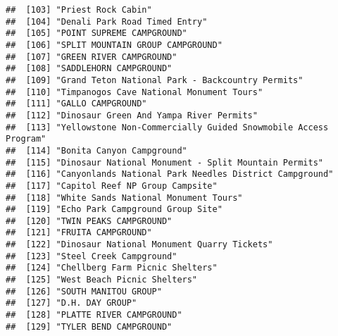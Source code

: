 \documentclass[
]{article}
\begin{document}
\begin{verbatim}
##  [103] "Priest Rock Cabin"                                                                   
##  [104] "Denali Park Road Timed Entry"                                                        
##  [105] "POINT SUPREME CAMPGROUND"                                                            
##  [106] "SPLIT MOUNTAIN GROUP CAMPGROUND"                                                     
##  [107] "GREEN RIVER CAMPGROUND"                                                              
##  [108] "SADDLEHORN CAMPGROUND"                                                               
##  [109] "Grand Teton National Park - Backcountry Permits"                                     
##  [110] "Timpanogos Cave National Monument Tours"                                             
##  [111] "GALLO CAMPGROUND"                                                                    
##  [112] "Dinosaur Green And Yampa River Permits"                                              
##  [113] "Yellowstone Non-Commercially Guided Snowmobile Access Program"                       
##  [114] "Bonita Canyon Campground"                                                            
##  [115] "Dinosaur National Monument - Split Mountain Permits"                                 
##  [116] "Canyonlands National Park Needles District Campground"                               
##  [117] "Capitol Reef NP Group Campsite"                                                      
##  [118] "White Sands National Monument Tours"                                                 
##  [119] "Echo Park Campground Group Site"                                                     
##  [120] "TWIN PEAKS CAMPGROUND"                                                               
##  [121] "FRUITA CAMPGROUND"                                                                   
##  [122] "Dinosaur National Monument Quarry Tickets"                                           
##  [123] "Steel Creek Campground"                                                              
##  [124] "Chellberg Farm Picnic Shelters"                                                      
##  [125] "West Beach Picnic Shelters"                                                          
##  [126] "SOUTH MANITOU GROUP"                                                                 
##  [127] "D.H. DAY GROUP"                                                                      
##  [128] "PLATTE RIVER CAMPGROUND"                                                             
##  [129] "TYLER BEND CAMPGROUND"                                                               

\end{verbatim}
\end{document}
